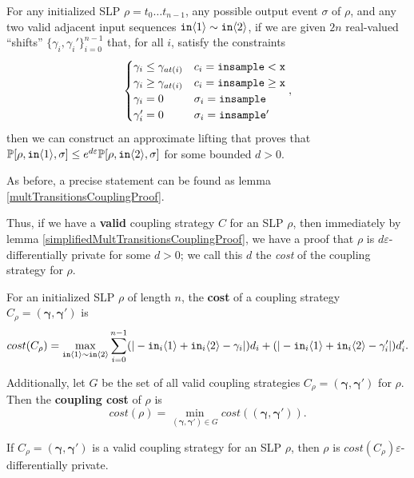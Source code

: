 \begin{lemma}\label{simplifiedMultTransitionsCouplingProof}
  For any initialized SLP $\rho = t_0\ldots t_{n-1}$, any possible output event $\sigma$ of $\rho$, and any two valid adjacent input sequences $\texttt{in}\brangle{1}\sim \texttt{in}\brangle{2}$, if we are given $2n$ real-valued ``shifts'' $\{\gamma_i, \gamma_i'\}_{i=0}^{n-1}$ that, for all $i$, satisfy the constraints \[
        \begin{cases}
          \gamma_i\leq\gamma_{at(i)} & c_i = \lguard[\texttt{x}]\\
          \gamma_i\geq\gamma_{at(i)} & c_i = \gguard[\texttt{x}]\\
          \gamma_i=0 & \sigma_i = \texttt{insample}\\
          \gamma_i'=0 & \sigma_i = \texttt{insample}'
        \end{cases},
      \]
      then we can construct an approximate lifting that proves that $\PP[\rho, \texttt{in}\brangle{1}, \sigma] \leq e^{d\varepsilon}\PP[\rho, \texttt{in}\brangle{2}, \sigma]$ for some bounded $d>0$. 
\end{lemma}

As before, a precise statement can be found as lemma \ref{multTransitionsCouplingProof}.

Thus, if we have a \textbf{valid} coupling strategy $C$ for an SLP $\rho$, then immediately by lemma \ref{simplifiedMultTransitionsCouplingProof}, we have a proof that $\rho$ is $d\varepsilon$-differentially private for some $d>0$; we call this $d$ the \textit{cost} of the coupling strategy for $\rho$. 

\begin{defn}
    For an initialized SLP $\rho$ of length $n$, the \textbf{cost} of a coupling strategy $C_\rho=(\bm{\gamma}, \bm{\gamma}')$ is \[cost(C_\rho) = \max_{\texttt{in}\brangle{1}\sim\texttt{in}\brangle{2}}\sum_{i=0}^{n-1}(|-\texttt{in}_i\brangle{1}+\texttt{in}_i\brangle{2}-\gamma_i|)d_i+(|-\texttt{in}_i\brangle{1}+\texttt{in}_i\brangle{2}-\gamma_i'|)d_i'.\]

    Additionally, let $G$ be the set of all valid coupling strategies $C_\rho=(\bm{\gamma}, \bm{\gamma}')$ for $\rho$. Then the \textbf{coupling cost} of $\rho$ is 
    \[cost(\rho) = \min_{(\bm{\gamma}, \bm{\gamma}')\in G}cost((\bm{\gamma}, \bm{\gamma}')).\]
\end{defn}

\begin{cor}\label{pathCostCor}
    If $C_\rho=(\bm{\gamma}, \bm{\gamma}')$ is a valid coupling strategy for an SLP $\rho$, then $\rho$ is $cost(C_\rho)\varepsilon$-differentially private.
\end{cor}

